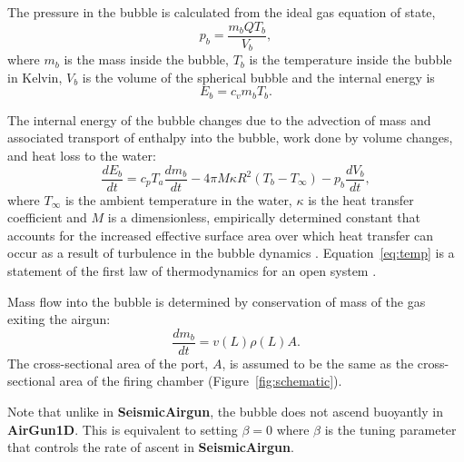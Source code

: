 \documentclass[10pt]{article}
\begin{document}
The pressure in the bubble is calculated from the ideal gas equation of state,
\begin{equation}
p_b = \frac{m_b Q T_b}{V_b},
\label{eq:bubble eos}
\end{equation}
where $m_b$ is the mass inside the bubble, $T_b$ is the temperature inside the bubble in Kelvin, $V_b$ is the volume of the spherical bubble and the internal energy is
\begin{equation}
E_b = c_v m_b T_b.
\label{eq:bubble int energy}
\end{equation}

The internal energy of the bubble changes due to the advection of mass and associated transport of enthalpy into the bubble, work done by volume changes, and heat loss to the water:
\begin{equation}
\frac{dE_b}{dt} = c_p T_a \frac{dm_b}{dt} - 4\pi M \kappa R^2 (T_b-T_\infty) - p_b \frac{dV_b}{dt},
\label{eq:temp}
\end{equation}
where $T_\infty$ is the ambient temperature in the water, $\kappa$ is the heat transfer coefficient \citep{Ni2011, deGraaf2014} and $M$ is a dimensionless, empirically determined constant that accounts for the increased effective surface area over which heat transfer can occur as a result of turbulence in the bubble dynamics \citep{Laws1990}. Equation~\ref{eq:temp} is a statement of the first law of thermodynamics for an open system \citep{Tolhoek1952}.

Mass flow into the bubble is determined by conservation of mass of the gas exiting the airgun:
\begin{equation}
\frac{dm_b}{dt} = v(L) \rho(L) A.
\label{eq:mass flow}
\end{equation}
The cross-sectional area of the port, $A$, is assumed to be the same as the cross-sectional area of the firing chamber (Figure~\ref{fig:schematic}).

Note that unlike in {\bf SeismicAirgun}, the bubble does not ascend buoyantly in {\bf AirGun1D}. This is equivalent to setting $\beta=0$ where $\beta$ is the tuning parameter that controls the rate of ascent in {\bf SeismicAirgun}.
\end{document}
